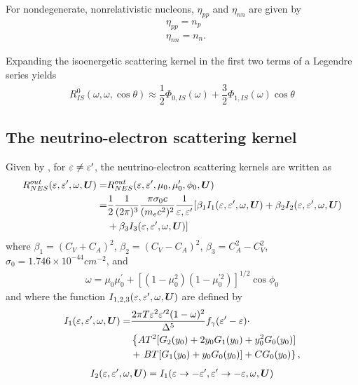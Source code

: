 \documentclass[10pt,preprint]{aastex}
\begin{document}
For nondegenerate, nonrelativistic nucleons, $\eta_{pp}$ and $\eta_{nn}$ are given by
\begin{align}
&\eta_{pp} = n_p \\
&\eta_{nn} = n_n.
\end{align}

Expanding the isoenergetic scattering kernel in the first two terms of a Legendre series yields
\begin{align}
R^{0}_{IS}(\omega, \omega, \cos\theta) \approx \dfrac{1}{2} \Phi_{0,IS}(\omega) + \dfrac{3}{2}\Phi_{1,IS}(\omega)\cos\theta
\end{align}

\subsection{The neutrino-electron scattering kernel}
Given by \citet{bruenn_1985}, for $\varepsilon \neq \varepsilon^\prime$, the neutrino-electron scattering kernels are written as
\begin{align}
    R^{out}_{NES}(\varepsilon,\varepsilon^\prime,\omega, \boldsymbol{U}) = & R^{out}_{NES}(\varepsilon,\varepsilon^\prime,\mu_0,\mu^\prime_0,\phi_0, \boldsymbol{U}) \nonumber \\
     = &\dfrac{1}{2}\dfrac{1}{(2\pi)^3}\dfrac{\pi \sigma_0 c}{(m_e c^2)^2}\dfrac{1}{\varepsilon, \varepsilon^\prime} [ \beta_1I_1(\varepsilon,\varepsilon^\prime,\omega,\boldsymbol{U}) + \beta_2I_2(\varepsilon,\varepsilon^\prime,\omega, \boldsymbol{U}) \nonumber \\
    & +  \beta_3I_3(\varepsilon,\varepsilon^\prime,\omega, \boldsymbol{U})] 
\end{align}
where $\beta_1 = (C_V + C_A)^2$, $\beta_2 = (C_V -C_A)^2$, $\beta_3 = C_A^2 - C_V^2$, $\sigma_0 = 1.746 \times 10^{-44} cm^{-2}$, and
\begin{align}
\omega = \mu_0 \mu_0^\prime + [(1-\mu_0^2)(1-\mu_0^{\prime 2})]^{1/2}\cos\phi_0
\end{align}
and where the function $I_{1,2,3}(\varepsilon,\varepsilon^\prime,\omega, \boldsymbol{U})$ are defined by 
\begin{align}
I_1(\varepsilon, \varepsilon^\prime, \omega, \boldsymbol{U}) = & \dfrac{2\pi T \varepsilon^2 \varepsilon^{\prime 2}(1-\omega)^2}{\Delta^5} f_\gamma(\varepsilon^\prime - \varepsilon) \cdot \\
& \left\lbrace  A T^2 [G_2(y_0)+2y_0G_1(y_0)+y_0^2G_0(y_0)] \right.\nonumber\\
& + \left. BT[G_1(y_0)+y_0G_0(y_0)] + CG_0(y_0)\right\rbrace,
\end{align}
\begin{align}
I_2(\varepsilon, \varepsilon^\prime, \omega, \boldsymbol{U})  = I_1(\varepsilon \rightarrow -\varepsilon^\prime, \varepsilon^\prime\rightarrow -\varepsilon, \omega, \boldsymbol{U}) 
\end{align}
\end{document}
